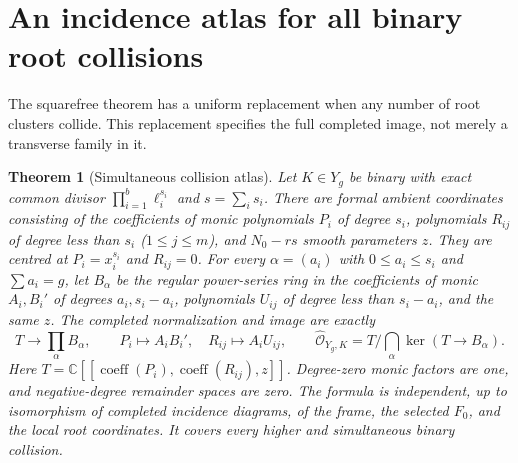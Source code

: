 \documentclass[11pt,reqno]{amsart}
\numberwithin{equation}{section}
\newtheorem{theorem}{Theorem}[section]
\theoremstyle{definition}\newtheorem{definition}[theorem]{Definition}
\theoremstyle{remark}\newtheorem{remark}[theorem]{Remark}
\newcommand{\C}{\mathbb C}\newcommand{\Q}{\mathbb Q}
\newcommand{\OO}{\mathcal O}\newcommand{\II}{\mathcal I}
\begin{document}
\section{An incidence atlas for all binary root collisions}
\label{sec:collision-atlas-v153}
The squarefree theorem has a uniform replacement when any number of
root clusters collide. This replacement specifies the full completed
image, not merely a transverse family in it.

\begin{theorem}[Simultaneous collision atlas]\label{thm:atlas-v153}
Let $K\in Y_g$ be binary with exact common divisor
$\prod_{i=1}^b\ell_i^{s_i}$ and $s=\sum_i s_i$. There are formal
ambient coordinates consisting of the coefficients of monic
polynomials $P_i$ of degree $s_i$, polynomials $R_{ij}$ of degree
less than $s_i$ ($1\leq j\leq m$), and $N_0-rs$ smooth parameters
$z$. They are centred at $P_i=x_i^{s_i}$ and $R_{ij}=0$.
For every $\alpha=(a_i)$ with $0\leq a_i\leq s_i$ and $\sum a_i=g$,
let $B_\alpha$ be the regular power-series ring in the coefficients
of monic $A_i,B_i'$ of degrees $a_i,s_i-a_i$, polynomials $U_{ij}$
of degree less than $s_i-a_i$, and the same $z$. The completed
normalization and image are exactly
\begin{equation}\label{eq:collision-image-v153}
 T\longrightarrow\prod_\alpha B_\alpha,\qquad
 P_i\mapsto A_iB_i',\quad R_{ij}\mapsto A_iU_{ij},\qquad
 \widehat{\OO}_{Y_g,K}=T/\bigcap_\alpha\ker(T\to B_\alpha).
\end{equation}
Here $T=\C[[\operatorname{coeff}(P_i),\operatorname{coeff}(R_{ij}),z]]$.
Degree-zero monic factors are one, and negative-degree remainder
spaces are zero. The formula is independent, up to isomorphism of
completed incidence diagrams, of the frame, the selected $F_0$, and
the local root coordinates. It covers every higher and simultaneous
binary collision.
\end{theorem}
\end{document}
